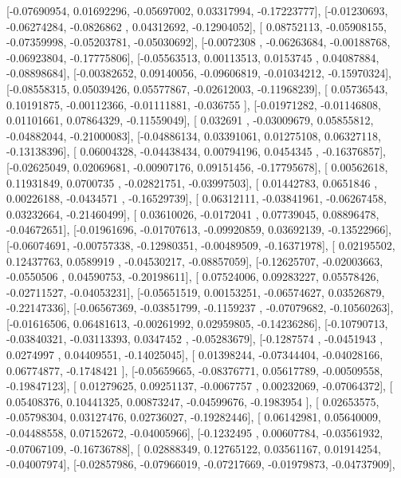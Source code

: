 \documentclass{article}
\begin{document}
       [-0.07690954,  0.01692296, -0.05697002,  0.03317994, -0.17223777],
       [-0.01230693, -0.06274284, -0.0826862 ,  0.04312692, -0.12904052],
       [ 0.08752113, -0.05908155, -0.07359998, -0.05203781, -0.05030692],
       [-0.0072308 , -0.06263684, -0.00188768, -0.06923804, -0.17775806],
       [-0.05563513,  0.00113513,  0.0153745 ,  0.04087884, -0.08898684],
       [-0.00382652,  0.09140056, -0.09606819, -0.01034212, -0.15970324],
       [-0.08558315,  0.05039426,  0.05577867, -0.02612003, -0.11968239],
       [ 0.05736543,  0.10191875, -0.00112366, -0.01111881, -0.036755  ],
       [-0.01971282, -0.01146808,  0.01101661,  0.07864329, -0.11559049],
       [ 0.032691  , -0.03009679,  0.05855812, -0.04882044, -0.21000083],
       [-0.04886134,  0.03391061,  0.01275108,  0.06327118, -0.13138396],
       [ 0.06004328, -0.04438434,  0.00794196,  0.0454345 , -0.16376857],
       [-0.02625049,  0.02069681, -0.00907176,  0.09151456, -0.17795678],
       [ 0.00562618,  0.11931849,  0.0700735 , -0.02821751, -0.03997503],
       [ 0.01442783,  0.0651846 ,  0.00226188, -0.0434571 , -0.16529739],
       [ 0.06312111, -0.03841961, -0.06267458,  0.03232664, -0.21460499],
       [ 0.03610026, -0.0172041 ,  0.07739045,  0.08896478, -0.04672651],
       [-0.01961696, -0.01707613, -0.09920859,  0.03692139, -0.13522966],
       [-0.06074691, -0.00757338, -0.12980351, -0.00489509, -0.16371978],
       [ 0.02195502,  0.12437763,  0.0589919 , -0.04530217, -0.08857059],
       [-0.12625707, -0.02003663, -0.0550506 ,  0.04590753, -0.20198611],
       [ 0.07524006,  0.09283227,  0.05578426, -0.02711527, -0.04053231],
       [-0.05651519,  0.00153251, -0.06574627,  0.03526879, -0.22147336],
       [-0.06567369, -0.03851799, -0.1159237 , -0.07079682, -0.10560263],
       [-0.01616506,  0.06481613, -0.00261992,  0.02959805, -0.14236286],
       [-0.10790713, -0.03840321, -0.03113393,  0.0347452 , -0.05283679],
       [-0.1287574 , -0.0451943 ,  0.0274997 ,  0.04409551, -0.14025045],
       [ 0.01398244, -0.07344404, -0.04028166,  0.06774877, -0.1748421 ],
       [-0.05659665, -0.08376771,  0.05617789, -0.00509558, -0.19847123],
       [ 0.01279625,  0.09251137, -0.0067757 ,  0.00232069, -0.07064372],
       [ 0.05408376,  0.10441325,  0.00873247, -0.04599676, -0.1983954 ],
       [ 0.02653575, -0.05798304,  0.03127476,  0.02736027, -0.19282446],
       [ 0.06142981,  0.05640009, -0.04488558,  0.07152672, -0.04005966],
       [-0.1232495 ,  0.00607784, -0.03561932, -0.07067109, -0.16736788],
       [ 0.02888349,  0.12765122,  0.03561167,  0.01914254, -0.04007974],
       [-0.02857986, -0.07966019, -0.07217669, -0.01979873, -0.04737909],
\end{document}
